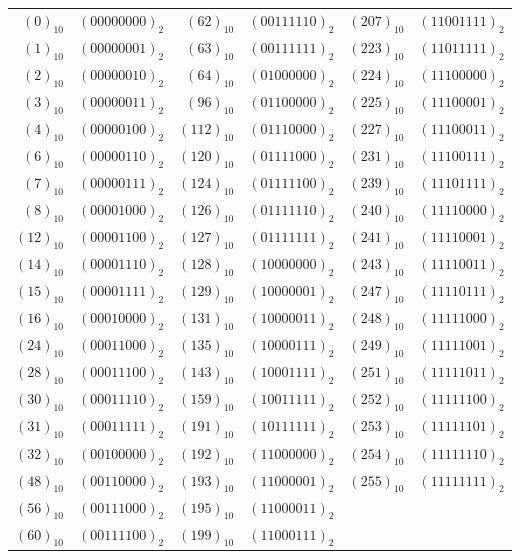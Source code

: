 \documentclass[12pt, a4paper]{article}
\begin{document}
\begin{tabular}{ | r r | r r | r r | }
	\hline
	\((0)_{10}\) & \((00000000)_{2}\) & \((62)_{10}\) & \((00111110)_{2}\) & \((207)_{10}\) & \((11001111)_{2}\) \\
	\((1)_{10}\) & \((00000001)_{2}\) & \((63)_{10}\) & \((00111111)_{2}\) & \((223)_{10}\) & \((11011111)_{2}\) \\
	\((2)_{10}\) & \((00000010)_{2}\) & \((64)_{10}\) & \((01000000)_{2}\) & \((224)_{10}\) & \((11100000)_{2}\) \\
	\((3)_{10}\) & \((00000011)_{2}\) & \((96)_{10}\) & \((01100000)_{2}\) & \((225)_{10}\) & \((11100001)_{2}\) \\
	\((4)_{10}\) & \((00000100)_{2}\) & \((112)_{10}\) & \((01110000)_{2}\) & \((227)_{10}\) & \((11100011)_{2}\) \\
	\((6)_{10}\) & \((00000110)_{2}\) & \((120)_{10}\) & \((01111000)_{2}\) & \((231)_{10}\) & \((11100111)_{2}\) \\
	\((7)_{10}\) & \((00000111)_{2}\) & \((124)_{10}\) & \((01111100)_{2}\) & \((239)_{10}\) & \((11101111)_{2}\) \\
	\((8)_{10}\) & \((00001000)_{2}\) & \((126)_{10}\) & \((01111110)_{2}\) & \((240)_{10}\) & \((11110000)_{2}\) \\
	\((12)_{10}\) & \((00001100)_{2}\) & \((127)_{10}\) & \((01111111)_{2}\) & \((241)_{10}\) & \((11110001)_{2}\) \\
	\((14)_{10}\) & \((00001110)_{2}\) & \((128)_{10}\) & \((10000000)_{2}\) & \((243)_{10}\) & \((11110011)_{2}\) \\
	\((15)_{10}\) & \((00001111)_{2}\) & \((129)_{10}\) & \((10000001)_{2}\) & \((247)_{10}\) & \((11110111)_{2}\) \\
	\((16)_{10}\) & \((00010000)_{2}\) & \((131)_{10}\) & \((10000011)_{2}\) & \((248)_{10}\) & \((11111000)_{2}\) \\
	\((24)_{10}\) & \((00011000)_{2}\) & \((135)_{10}\) & \((10000111)_{2}\) & \((249)_{10}\) & \((11111001)_{2}\) \\
	\((28)_{10}\) & \((00011100)_{2}\) & \((143)_{10}\) & \((10001111)_{2}\) & \((251)_{10}\) & \((11111011)_{2}\) \\
	\((30)_{10}\) & \((00011110)_{2}\) & \((159)_{10}\) & \((10011111)_{2}\) & \((252)_{10}\) & \((11111100)_{2}\) \\
	\((31)_{10}\) & \((00011111)_{2}\) & \((191)_{10}\) & \((10111111)_{2}\) & \((253)_{10}\) & \((11111101)_{2}\) \\
	\((32)_{10}\) & \((00100000)_{2}\) & \((192)_{10}\) & \((11000000)_{2}\) & 	\((254)_{10}\) & \((11111110)_{2}\) \\
	\((48)_{10}\) & \((00110000)_{2}\) & \((193)_{10}\) & \((11000001)_{2}\) & 	\((255)_{10}\) & \((11111111)_{2}\) \\
	\((56)_{10}\) & \((00111000)_{2}\) & \((195)_{10}\) & \((11000011)_{2}\) & & \\
	\((60)_{10}\) & \((00111100)_{2}\) & \((199)_{10}\) & \((11000111)_{2}\) & & \\
	\hline
\end{tabular}
\bigskip
\end{document}
